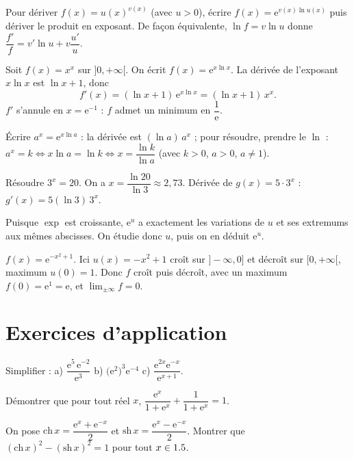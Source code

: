 Pour dériver $f(x)=u(x)^{v(x)}$ (avec $u>0$), écrire $f(x)=\mathrm{e}^{v(x)\ln u(x)}$ puis dériver
le produit en exposant. De façon équivalente, $\ln f=v\ln u$ donne
$\dfrac{f'}{f}=v'\ln u+v\dfrac{u'}{u}$.
\begin{exemple}
Soit $f(x)=x^{x}$ sur $]0,+\infty[$. On écrit $f(x)=\mathrm{e}^{x\ln x}$. La dérivée de l'exposant
$x\ln x$ est $\ln x+1$, donc
\[
f'(x)=(\ln x+1)\,\mathrm{e}^{x\ln x}=(\ln x+1)\,x^{x}.
\]
$f'$ s'annule en $x=\mathrm{e}^{-1}$ : $f$ admet un minimum en $\dfrac1{\mathrm{e}}$.
\end{exemple}

Écrire $a^{x}=\mathrm{e}^{x\ln a}$ : la dérivée est $(\ln a)\,a^{x}$ ; pour résoudre, prendre le
$\ln$ : $a^{x}=k\iff x\ln a=\ln k\iff x=\dfrac{\ln k}{\ln a}$ (avec $k>0$, $a>0$, $a\ne1$).
\begin{exemple}
Résoudre $3^{x}=20$. On a $x=\dfrac{\ln 20}{\ln 3}\approx 2{,}73$. \;Dérivée de
$g(x)=5\cdot3^{x}$ : $g'(x)=5(\ln 3)\,3^{x}$.
\end{exemple}

Puisque $\exp$ est croissante, $\mathrm{e}^{u}$ a exactement les variations de $u$ et ses
extremums aux mêmes abscisses. On étudie donc $u$, puis on en déduit $\mathrm{e}^{u}$.
\begin{exemple}
$f(x)=\mathrm{e}^{-x^{2}+1}$. Ici $u(x)=-x^{2}+1$ croît sur $]-\infty,0]$ et décroît sur
$[0,+\infty[$, maximum $u(0)=1$. Donc $f$ croît puis décroît, avec un maximum
$f(0)=\mathrm{e}^{1}=\mathrm{e}$, et $\lim_{\pm\infty}f=0$.
\end{exemple}

\section{Exercices d'application}

\exo{} Simplifier : a) $\dfrac{\mathrm{e}^{5}\,\mathrm{e}^{-2}}{\mathrm{e}^{3}}$ \quad
b) $\big(\mathrm{e}^{2}\big)^{3}\mathrm{e}^{-4}$ \quad
c) $\dfrac{\mathrm{e}^{2x}\mathrm{e}^{-x}}{\mathrm{e}^{x+1}}$.

\exo{} Démontrer que pour tout réel $x$,
$\dfrac{\mathrm{e}^{x}}{1+\mathrm{e}^{x}}+\dfrac{1}{1+\mathrm{e}^{x}}=1$.

\exo{} On pose $\mathrm{ch}\,x=\dfrac{\mathrm{e}^{x}+\mathrm{e}^{-x}}{2}$ et
$\mathrm{sh}\,x=\dfrac{\mathrm{e}^{x}-\mathrm{e}^{-x}}{2}$. Montrer que
$(\mathrm{ch}\,x)^{2}-(\mathrm{sh}\,x)^{2}=1$ pour tout $x\in1.5$.

